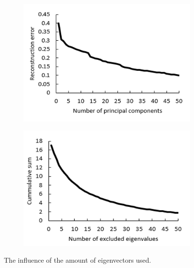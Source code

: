 \documentclass[a4paper,10pt]{article}
\begin{document}
\begin{figure}[h]
	\centering
	\begin{subfigure}[c]{0.49\textwidth}
		\centering
		\includegraphics[width=0.85\linewidth]{Reconstruction_error1.png}
		\caption{}
		\label{fig:Reconstruction_error1}
	\end{subfigure}
	\begin{subfigure}[c]{0.49\textwidth}
		\centering
		\includegraphics[width=0.8\linewidth]{Reconstruction_error2.png}
		\caption{}
		\label{fig:Reconstruction_error2}
	\end{subfigure}
	\caption{The influence of the amount of eigenvectors used.}
	\label{fig:Results2}
\end{figure}
\end{document}
